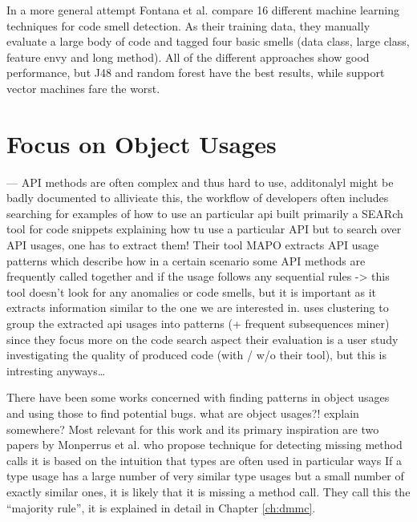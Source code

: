 In a more general attempt Fontana et al. \cite{fontana2013code}\cite{fontana2016comparing} compare 16 different machine learning techniques for code smell detection.
As their training data, they manually evaluate a large body of code and tagged four basic smells (data class, large class, feature envy and long method).
All of the different approaches show good performance, but J48 and random forest have the best results, while support vector machines fare the worst.

\section{Focus on Object Usages}



---
API methods are often complex and thus hard to use, additonalyl might be badly documented
to allivieate this, the workflow of developers often includes searching for examples of how to use an particular api
\cite{zhong2009mapo} built 
primarily a SEARch tool for code snippets explaining how tu use a particular API
but to search over API usages, one has to extract them!
Their tool MAPO extracts API usage patterns which describe how in a certain scenario some API methods are frequently called together and if the usage follows any sequential rules
-> this tool doesn't look for any anomalies or code smells, but it is important as it extracts information similar to the one we are interested in.
uses clustering to group the extracted api usages into patterns (+ frequent subsequences miner)
since they focus more on the code search aspect their evaluation is a user study investigating the quality of produced code (with / w/o their tool), but this is intresting anyways\ldots

\cite{monperrus2010detecting}\cite{monperrus2013detecting} 
There have been some works concerned with finding patterns in object usages and using those to find potential bugs.
    what are object usages?! explain somewhere?
Most relevant for this work and its primary inspiration are two papers by Monperrus et al. who propose technique for detecting missing method calls
it is based on the intuition that
types are often used in particular ways
If a type usage has a large number of very similar type usages but a small number of exactly similar ones, it is likely that it is missing a method call.
They call this the ``majority rule'', it is explained in detail in Chapter \ref{ch:dmmc}.


